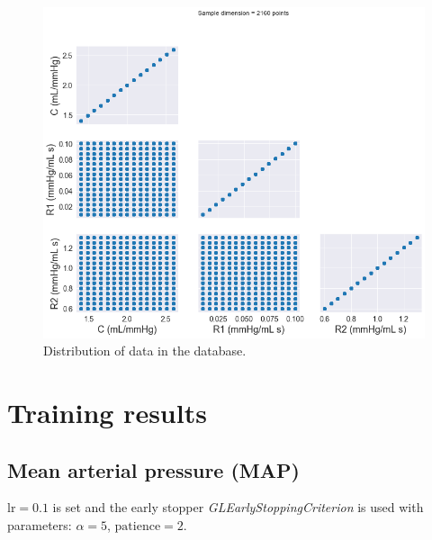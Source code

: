 \begin{figure}[h]
    \centering
    \includegraphics[width=1\textwidth]{images/Training (risultati)/database.png}
    \caption{Distribution of data in the database.}
    \label{distribuzioneDataset}
\end{figure}

\newpage
\section{Training results}


\subsection{Mean arterial pressure (MAP)}
$\text{lr}=0.1$ is set and the early stopper \textit{GLEarlyStoppingCriterion} is used with parameters: $\alpha = 5$, $\text{patience}=2$.


